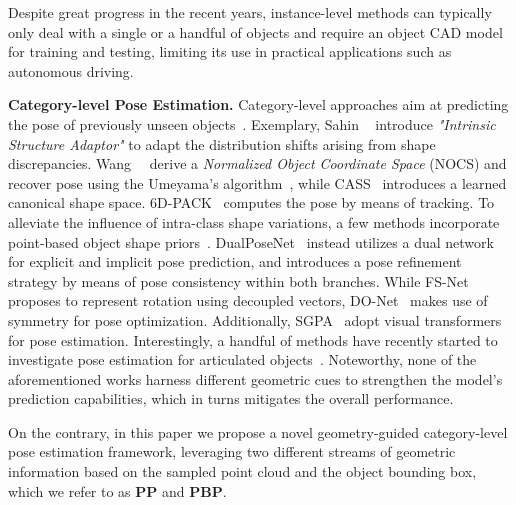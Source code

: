 \documentclass[10pt,twocolumn,letterpaper]{article}
\begin{document}
Despite great progress in the recent years, instance-level methods can typically only deal with a single or a handful of objects and require an object CAD model for training and testing, limiting its use in practical applications such as autonomous driving.


\textbf{Category-level Pose Estimation.}
Category-level approaches aim at predicting the pose of previously unseen objects~\cite{manhardt2020cps,NOCS}.
Exemplary, Sahin \etal~\cite{9d1} introduce \textit{"Intrinsic Structure Adaptor"} to adapt the distribution shifts arising from shape discrepancies.
Wang~\etal~\cite{NOCS} derive a \textit{Normalized Object Coordinate Space} (NOCS) and recover pose using the Umeyama's algorithm~\cite{umeyama1991least}, while CASS~\cite{cass} introduces a learned canonical shape space.
6D-PACK~\cite{6dpack} computes the pose by means of tracking.
To alleviate the influence of intra-class shape variations, a few methods incorporate point-based object shape priors~\cite{shape_deform, sgpa, donet}.
DualPoseNet~\cite{dualposenet} instead utilizes a dual network for explicit and implicit pose prediction, and introduces a pose refinement strategy by means of pose consistency within both branches.
While FS-Net~\cite{fs-net} proposes to represent rotation using decoupled vectors, DO-Net~\cite{donet} makes use of symmetry for pose optimization.
Additionally, SGPA~\cite{sgpa} adopt visual transformers~\cite{transformer} for pose estimation.
Interestingly, a handful of methods have recently started to investigate pose estimation for articulated objects~\cite{aticategory, captra}.
Noteworthy, none of the aforementioned works harness different geometric cues to strengthen the model's prediction capabilities, which in turns mitigates the overall performance. 

On the contrary, in this paper we propose a novel geometry-guided category-level pose estimation framework, leveraging two different streams of geometric information based on the sampled point cloud and the object bounding box, which we refer to as \textbf{PP} and \textbf{PBP}.
\end{document}

